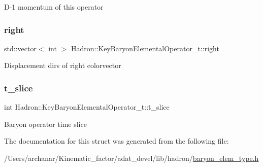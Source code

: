D-\/1 momentum of this operator \mbox{\label{structHadron_1_1KeyBaryonElementalOperator__t_ac05464b673873344a6ccf42673bf0c1b}} 
\subsubsection{\texorpdfstring{right}{right}}
{\footnotesize\ttfamily std\+::vector$<$ int $>$ Hadron\+::\+Key\+Baryon\+Elemental\+Operator\+\_\+t\+::right}

Displacement dirs of right colorvector \mbox{\label{structHadron_1_1KeyBaryonElementalOperator__t_a5f9b88389c2511c843a8195a7846a558}} 
\subsubsection{\texorpdfstring{t\_slice}{t\_slice}}
{\footnotesize\ttfamily int Hadron\+::\+Key\+Baryon\+Elemental\+Operator\+\_\+t\+::t\+\_\+slice}

Baryon operator time slice 

The documentation for this struct was generated from the following file\+:\begin{DoxyCompactItemize}
\item 
/\+Users/archanar/\+Kinematic\+\_\+factor/adat\+\_\+devel/lib/hadron/\mbox{\hyperlink{lib_2hadron_2baryon__elem__type_8h}{baryon\+\_\+elem\+\_\+type.\+h}}\end{DoxyCompactItemize}
